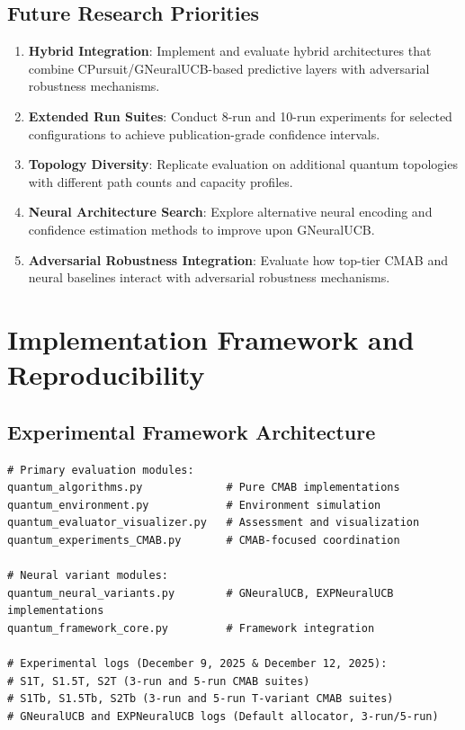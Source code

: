 \documentclass[12pt,a4paper]{article}
\begin{document}
\subsection{Future Research Priorities}

\begin{enumerate}
\item \textbf{Hybrid Integration}: Implement and evaluate hybrid architectures that combine CPursuit/GNeuralUCB-based predictive layers with adversarial robustness mechanisms.
\item \textbf{Extended Run Suites}: Conduct 8-run and 10-run experiments for selected configurations to achieve publication-grade confidence intervals.
\item \textbf{Topology Diversity}: Replicate evaluation on additional quantum topologies with different path counts and capacity profiles.
\item \textbf{Neural Architecture Search}: Explore alternative neural encoding and confidence estimation methods to improve upon GNeuralUCB.
\item \textbf{Adversarial Robustness Integration}: Evaluate how top-tier CMAB and neural baselines interact with adversarial robustness mechanisms.
\end{enumerate}

\section{Implementation Framework and Reproducibility}

\subsection{Experimental Framework Architecture}

\begin{lstlisting}[caption=Core Framework Components]
# Primary evaluation modules:
quantum_algorithms.py             # Pure CMAB implementations
quantum_environment.py            # Environment simulation
quantum_evaluator_visualizer.py   # Assessment and visualization
quantum_experiments_CMAB.py       # CMAB-focused coordination

# Neural variant modules:
quantum_neural_variants.py        # GNeuralUCB, EXPNeuralUCB implementations
quantum_framework_core.py         # Framework integration

# Experimental logs (December 9, 2025 & December 12, 2025):
# S1T, S1.5T, S2T (3-run and 5-run CMAB suites)
# S1Tb, S1.5Tb, S2Tb (3-run and 5-run T-variant CMAB suites)
# GNeuralUCB and EXPNeuralUCB logs (Default allocator, 3-run/5-run)
\end{lstlisting}
\end{document}
